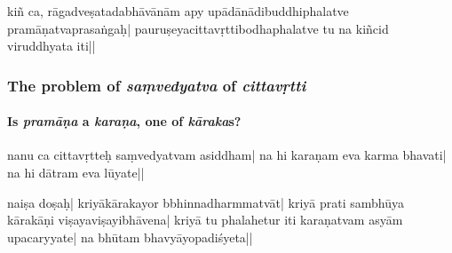 kiñ ca, rāgadveṣatadabhāvā\mde nām apy upādānādibuddhiphalatve pramāṇatva\-prasaṅgaḥ|
pauruṣeyacittavṛttibodhaphalatve tu na %
kiñcid viru\mds ddhyata iti||

\subsubsection{The problem of \emph{saṃvedyatva} of \emph{cittavṛtti}}
\paragraph{Is \emph{pramāṇa} a \emph{karaṇa}, one of \emph{kāraka}s?}

\mde nanu ca cittavṛtteḥ saṃvedyatvam asiddham| na hi ka\mds raṇam eva karma bhavati| na hi dātram eva lūyate||

nai\mde ṣa doṣaḥ| kriyākāraka\mds yor bbhinnadha\mde rmmatvāt| kriyā 
prati sa\-m\-bhū\-ya %
kārakāṇi  
viṣayaviṣayibhāvena|  kri\mde yā tu  
\mds phalahetur iti karaṇatvam asyām upacaryyate| na 
bhūtam bhavyāyopadiśyeta|| %

